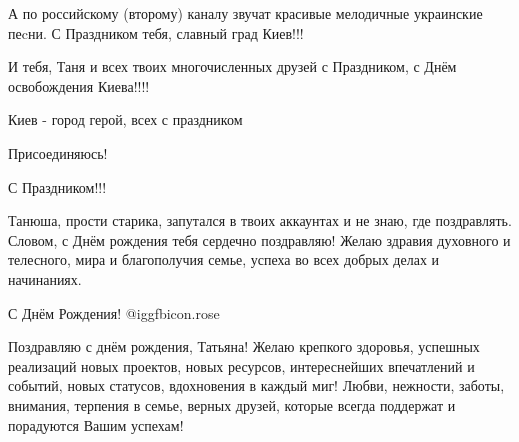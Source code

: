 \begin{itemize}
А по российскому (второму) каналу звучат красивые мелодичные украинские пеcни. С Праздником тебя, славный град Киев!!!

И тебя, Таня и всех твоих многочисленных друзей с Праздником, с Днём освобождения Киева!!!!

Киев - город герой, всех с праздником

Присоединяюсь!

С Праздником!!!


Танюша, прости старика, запутался в твоих аккаунтах и не знаю, где поздравлять.
Словом, с Днём рождения тебя сердечно поздравляю! Желаю здравия духовного и
телесного, мира и благополучия семье, успеха во всех добрых делах и начинаниях.


С Днём Рождения! @igg{fbicon.rose} 


Поздравляю с днём рождения, Татьяна! Желаю крепкого здоровья, успешных
реализаций новых проектов, новых ресурсов, интереснейших впечатлений и
событий, новых статусов, вдохновения в каждый миг! Любви, нежности, заботы,
внимания, терпения в семье, верных друзей, которые всегда поддержат и
порадуются Вашим успехам!

\end{itemize} %
